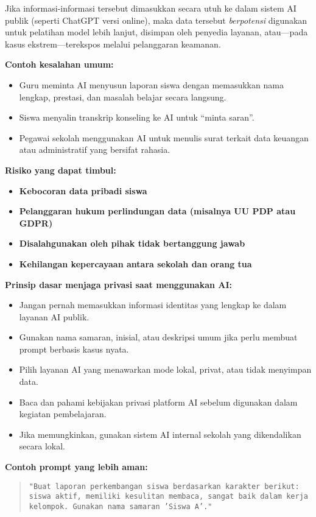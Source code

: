 Jika informasi-informasi tersebut dimasukkan secara utuh ke dalam sistem AI publik (seperti ChatGPT versi online), maka data tersebut \textit{berpotensi} digunakan untuk pelatihan model lebih lanjut, disimpan oleh penyedia layanan, atau—pada kasus ekstrem—terekspos melalui pelanggaran keamanan.

\textbf{Contoh kesalahan umum:}
\begin{itemize}
	\item Guru meminta AI menyusun laporan siswa dengan memasukkan nama lengkap, prestasi, dan masalah belajar secara langsung.
	\item Siswa menyalin transkrip konseling ke AI untuk “minta saran”.
	\item Pegawai sekolah menggunakan AI untuk menulis surat terkait data keuangan atau administratif yang bersifat rahasia.
\end{itemize}

\textbf{Risiko yang dapat timbul:}
\begin{itemize}
	\item \textbf{Kebocoran data pribadi siswa}
	\item \textbf{Pelanggaran hukum perlindungan data (misalnya UU PDP atau GDPR)}
	\item \textbf{Disalahgunakan oleh pihak tidak bertanggung jawab}
	\item \textbf{Kehilangan kepercayaan antara sekolah dan orang tua}
\end{itemize}

\textbf{Prinsip dasar menjaga privasi saat menggunakan AI:}
\begin{itemize}
	\item Jangan pernah memasukkan informasi identitas yang lengkap ke dalam layanan AI publik.
	\item Gunakan nama samaran, inisial, atau deskripsi umum jika perlu membuat prompt berbasis kasus nyata.
	\item Pilih layanan AI yang menawarkan mode lokal, privat, atau tidak menyimpan data.
	\item Baca dan pahami kebijakan privasi platform AI sebelum digunakan dalam kegiatan pembelajaran.
	\item Jika memungkinkan, gunakan sistem AI internal sekolah yang dikendalikan secara lokal.
\end{itemize}

\textbf{Contoh prompt yang lebih aman:}

\begin{quote}
	\centering
	\texttt{"Buat laporan perkembangan siswa berdasarkan karakter berikut: siswa aktif, memiliki kesulitan membaca, sangat baik dalam kerja kelompok. Gunakan nama samaran 'Siswa A'."}
\end{quote}

